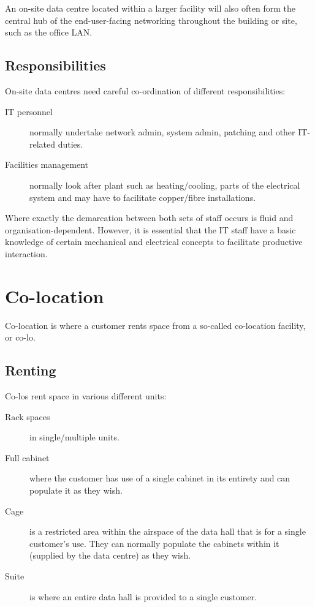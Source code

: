 An on-site data centre located within a larger facility will also often form the central hub of the end-user-facing networking throughout the building or site, such as the office LAN.

\subsection{Responsibilities}

On-site data centres need careful co-ordination of different responsibilities:
\begin{description}
\item[IT personnel] normally undertake network admin, system admin, patching and other IT-related duties.
\item[Facilities management] normally look after plant such as heating/cooling, parts of the electrical system and may have to facilitate copper/fibre installations.
\end{description}
Where exactly the demarcation between both sets of staff occurs is fluid and organisation-dependent.
However, it is essential that the IT staff have a basic knowledge of certain mechanical and electrical concepts to facilitate productive interaction. 

\section{Co-location}

Co-location is where a customer rents space from a so-called co-location facility, or co-lo.

\subsection{Renting}

Co-los rent space in various different units:
\begin{description}
\item[Rack spaces] in single/multiple units.
\item[Full cabinet] where the customer has use of a single cabinet in its entirety and can populate it as they wish.
\item[Cage] is a restricted area within the airspace of the data hall that is for a single customer's use.  They can normally populate the cabinets within it (supplied by the data centre) as they wish. 
\item[Suite] is where an entire data hall is provided to a single customer.
\end{description}

